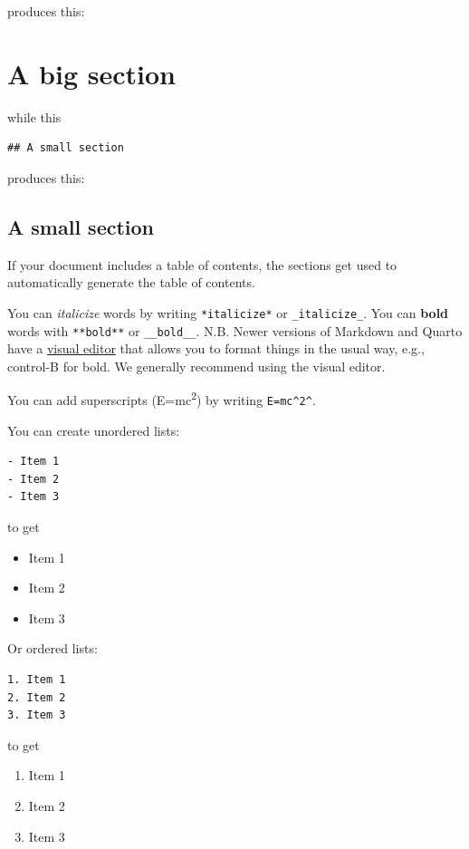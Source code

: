 \documentclass[
  letterpaper,
  DIV=11,
  numbers=noendperiod]{scrreprt}
\providecommand{\tightlist}{%
  \setlength{\itemsep}{0pt}\setlength{\parskip}{0pt}}\usepackage{longtable,booktabs,array}
\begin{document}
produces this:

\hypertarget{a-big-section}{%
\chapter{A big section}\label{a-big-section}}

while this

\begin{verbatim}
## A small section
\end{verbatim}

produces this:

\hypertarget{a-small-section}{%
\section{A small section}\label{a-small-section}}

If your document includes a table of contents, the sections get used to
automatically generate the table of contents.

You can \emph{italicize} words by writing \texttt{*italicize*} or
\texttt{\_italicize\_}. You can \textbf{bold} words with
\texttt{**bold**} or \texttt{\_\_bold\_\_}. N.B. Newer versions of
Markdown and Quarto have a
\href{https://rstudio.github.io/visual-markdown-editing/}{visual editor}
that allows you to format things in the usual way, e.g., control-B for
bold. We generally recommend using the visual editor.

You can add superscripts (E=mc\textsuperscript{2}) by writing
\texttt{E=mc\^{}2\^{}}.

You can create unordered lists:

\begin{verbatim}
- Item 1
- Item 2
- Item 3
\end{verbatim}

to get

\begin{itemize}
\tightlist
\item
  Item 1
\item
  Item 2
\item
  Item 3
\end{itemize}

Or ordered lists:

\begin{verbatim}
1. Item 1
2. Item 2
3. Item 3
\end{verbatim}

to get

\begin{enumerate}
\def\labelenumi{\arabic{enumi}.}
\tightlist
\item
  Item 1
\item
  Item 2
\item
  Item 3
\end{enumerate}
\end{document}

